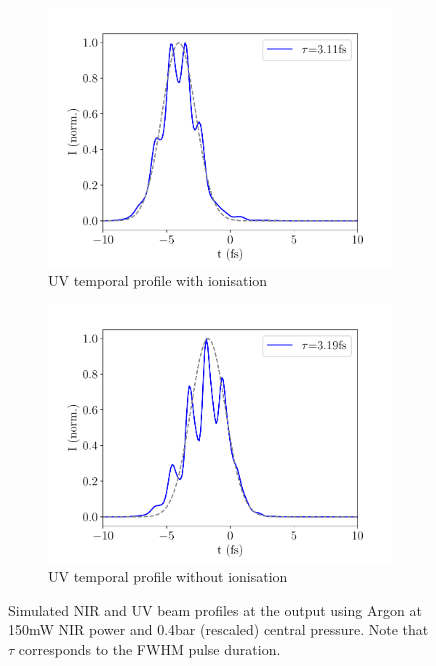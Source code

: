 \documentclass[a4paper]{jpconf}
\begin{document}
\begin{figure}[h]
\begin{subfigure}{0.49\textwidth}
        \includegraphics[width=\textwidth]{im/temporal_Ar_ion}
    \caption{UV temporal profile with ionisation}
    \end{subfigure}
    \begin{subfigure}{0.49\textwidth}
        \includegraphics[width=\textwidth]{im/temporal_Ar_no_ion}
    \caption{UV temporal profile without ionisation}
    \end{subfigure}  
\caption{Simulated NIR and UV beam profiles at the output using Argon at 150mW NIR power and 0.4bar (rescaled) central pressure. Note that $\tau$ corresponds to the FWHM pulse duration.}\label{im:profile_Ar}
\end{figure}
\end{document}
